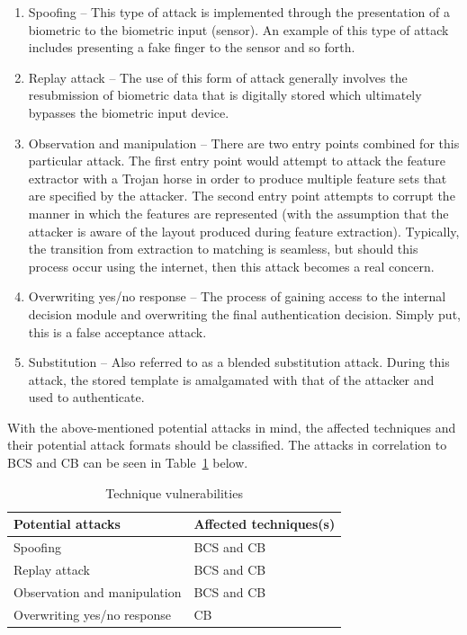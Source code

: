     \begin{enumerate}[label=\roman*.]
    
        \item Spoofing – This type of attack is implemented through the presentation of a   biometric to the biometric input (sensor). An example of this type of attack includes presenting a fake finger to the sensor and so forth.
        \item Replay attack – The use of this form of attack generally involves the resubmission of biometric data that is digitally stored which ultimately bypasses the biometric input device.
        \item Observation and manipulation – There are two entry points combined for this particular attack. The first entry point would attempt to attack the feature extractor with a Trojan horse in order to produce multiple feature sets that are specified by the attacker. The second entry point attempts to corrupt the manner in which the features are represented (with the assumption that the attacker is aware of the layout produced during feature extraction). Typically, the transition from extraction to matching is seamless, but should this process occur using the internet, then this attack becomes a real concern.
        \item Overwriting yes/no response – The process of gaining access to the internal decision module and overwriting the final authentication decision. Simply put, this is a false acceptance attack.
        \item Substitution – Also referred to as a blended substitution attack. During this attack, the stored template is amalgamated with that of the attacker and used to authenticate.

    \end{enumerate}
    
    With the above-mentioned potential attacks in mind, the affected techniques and their potential attack formats should be classified. The attacks in correlation to BCS and CB can be seen in Table~\ref{table:Technique vulnerabilities} below.
    
    
    \begin{table}[h]
    \caption{Technique vulnerabilities}
    \centering
     \begin{tabular}{|p{} | p{}|} 
     \hline
    	\textbf{Potential attacks} & \textbf{Affected techniques(s)} \\ [1ex] 
     \hline\hline 
     Spoofing & BCS and CB  \\[1ex]
     \hline 
     Replay attack & BCS and CB \\[1ex]
     \hline
     Observation and manipulation & BCS and CB\\[1ex]
     \hline           
     Overwriting yes/no response & CB\\[1ex]
     \hline
     \end{tabular}
     \label{table:Technique vulnerabilities}
    \end{table}
    
